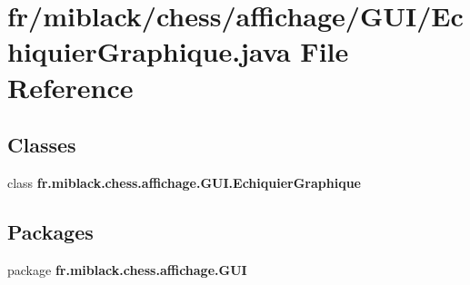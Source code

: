 \section{fr/miblack/chess/affichage/\-G\-U\-I/\-Echiquier\-Graphique.java File Reference}
\label{EchiquierGraphique_8java}
\subsection*{Classes}
\begin{DoxyCompactItemize}
\item 
class {\bf fr.\-miblack.\-chess.\-affichage.\-G\-U\-I.\-Echiquier\-Graphique}
\end{DoxyCompactItemize}
\subsection*{Packages}
\begin{DoxyCompactItemize}
\item 
package {\bf fr.\-miblack.\-chess.\-affichage.\-G\-U\-I}
\end{DoxyCompactItemize}

